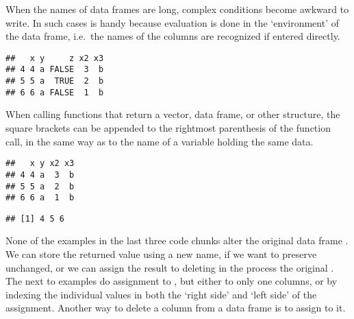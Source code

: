 \documentclass[paper=a4,10pt,div=17,headsepline,BCOR=12mm,twoside,open=right]{scrbook}\usepackage{knitr}
\begin{document}
When the names of data frames are long, complex conditions become awkward to write. In such cases  is handy because evaluation is done in the `environment' of the data frame, i.e.\ the names of the columns are recognized if entered directly.

\begin{knitrout}\footnotesize
{}\color{fgcolor}\begin{kframe}
\begin{alltt}
 \hlopt{>} \hlstd{)}
\end{alltt}
\begin{verbatim}
##   x y     z x2 x3
## 4 4 a FALSE  3  b
## 5 5 a  TRUE  2  b
## 6 6 a FALSE  1  b
\end{verbatim}
\end{kframe}
\end{knitrout}

When calling functions that return a vector, data frame, or other structure, the square brackets can be appended to the rightmost parenthesis of the function call, in the same way as to the name of a variable holding the same data.

\begin{knitrout}\footnotesize
{}\color{fgcolor}\begin{kframe}
\begin{alltt}
 \hlopt{>} \hlstd{)[ ,} \hlopt{-}\hlstd{]}
\end{alltt}
\begin{verbatim}
##   x y x2 x3
## 4 4 a  3  b
## 5 5 a  2  b
## 6 6 a  1  b
\end{verbatim}
\begin{alltt}
 \hlopt{>} \hlstd{)}\hlopt{$}
\end{alltt}
\begin{verbatim}
## [1] 4 5 6
\end{verbatim}
\end{kframe}
\end{knitrout}

None of the examples in the last three code chunks alter the original data frame . We can store the returned value using a new name, if we want to preserve  unchanged, or we can assign the result to  deleting in the process the original . The next to examples do assignment to , but either to only one columns, or by indexing the individual values in both the `right side' and `left side' of the assignment.
Another way to delete a column from a data frame is to assign  to it.
\end{document}
